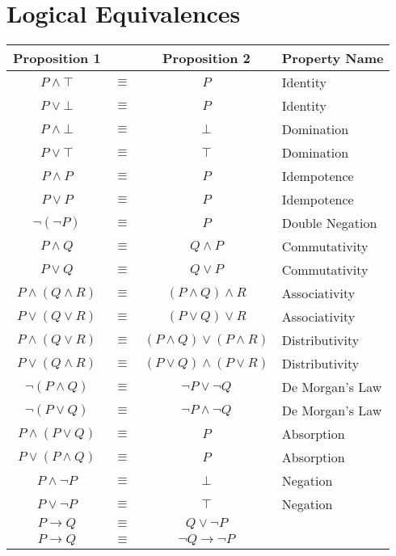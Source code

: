 \documentclass{article}
\begin{document}
\section{Logical Equivalences}
\label{equivalence}

\renewcommand{\arraystretch}{1.25}
\begin{tabularx}{\textwidth}{cccX}
    Proposition 1 & & Proposition 2 & Property Name \\
    \hline
    $P \wedge \top$ & $\equiv$ & $P$ & Identity \\
    $P \vee \bot$ & $\equiv$ & $P$ & Identity \\
    $P \wedge \bot$ & $\equiv$ & $\bot$ & Domination \\
    $P \vee \top$ & $\equiv$ & $\top$ & Domination \\
    $P \wedge P$ & $\equiv$ & $P$ & Idempotence \\
    $P \vee P$ & $\equiv$ & $P$ & Idempotence \\
    $\neg (\neg P)$ & $\equiv$ & $P$ & Double Negation\\
    $P \wedge Q$ & $\equiv$ & $Q \wedge P$ & Commutativity \\
    $P \vee Q$ & $\equiv$ & $Q \vee P$ & Commutativity \\
    $P \wedge (Q \wedge R)$ & $\equiv$ & $(P \wedge Q) \wedge R$ & Associativity\\
    $P \vee (Q \vee R)$ & $\equiv$ & $(P \vee Q) \vee R$ & Associativity \\
    $P \wedge (Q \vee R)$ & $\equiv$ & $(P \wedge Q) \vee (P \wedge R)$ & Distributivity \\
    $P \vee (Q \wedge R)$ & $\equiv$ & $(P \vee Q) \wedge (P \vee R)$ & Distributivity \\
    $\neg (P \wedge Q)$ & $\equiv$ & $\neg P \vee \neg Q$ & De Morgan's Law \\
    $\neg (P \vee Q)$ & $\equiv$ & $\neg P \wedge \neg Q$ & De Morgan's Law \\
    $P \wedge (P \vee Q)$ & $\equiv$ & $P$ & Absorption \\
    $P \vee (P \wedge Q)$ & $\equiv$ & $P$ & Absorption \\
    $P \wedge \neg P$ & $\equiv$ & $\bot$ & Negation \\
    $P \vee \neg P$ & $\equiv$ & $\top$ & Negation \\
    \hline
    $P \rightarrow Q$ & $\equiv$ & $Q \vee \neg P$ \\
    $P \rightarrow Q$ & $\equiv$ & $\neg Q \rightarrow \neg P$ \\

\end{tabularx}
\end{document}
